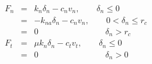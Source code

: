 


\begin{eqnarray*}
 F_n &=& k_n \delta_n - c_n v_n, \qquad \delta_n \le 0 \\
     &=& -k_{na} \delta_n - c_n v_n, \qquad 0 < \delta_n \le r_c \\
     &=& 0 \qquad \qquad \qquad \qquad \delta_n > r_c \\
 F_t &=& \mu k_n \delta_n - c_t v_t, \qquad \delta_n \le 0 \\
     &=& 0 \qquad \qquad \qquad \qquad \delta_n > 0
\end{eqnarray*}


